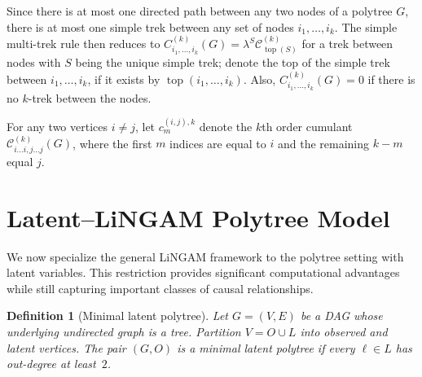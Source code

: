 \documentclass[11pt,a4paper]{article}
\numberwithin{equation}{section}
\newtheorem{definition}[theorem]{Definition}
\DeclareMathOperator{\ttop}{top}
\begin{document}
Since there is at most one directed path between any two nodes of a polytree $G$, there is at most one simple trek between any set of nodes $i_1,\dots,i_k$. The simple multi-trek rule then reduces to $C^{(k)}_{i_1,\dots,i_k}(G)=\lambda^{S}\mathcal{C}^{(k)}_{\ttop(S)}$ for a trek between nodes with $S$ being the unique simple trek; denote the top of the simple trek between $i_1,\dots,i_k$, if it exists by $\ttop(i_1,\dots,i_k)$. Also, $C^{(k)}_{i_1,\dots,i_k}(G)=0$ if there is no $k$-trek between the nodes.

For any two vertices $i\not=j$, let $c^{(i,j),k}_m$ denote the $k$th order cumulant $\mathcal{C}^{(k)}_{{i\dots i},{j\dots j}}(G)$, where the first $m$ indices are equal to $i$ and the remaining $k-m$ equal $j$.
\newcommand{\cumedge}[3]{c_{#1,#2#3}}  %
\section{Latent--LiNGAM Polytree Model}
\label{sec:model}

We now specialize the general LiNGAM framework to the polytree setting with latent variables. This restriction provides significant computational advantages while still capturing important classes of causal relationships.

\begin{definition}[Minimal latent polytree]\label{def:minimal_polytree}
Let $G=(V,E)$ be a DAG whose underlying undirected graph is a tree. Partition $V=O\cup L$ into observed and latent vertices. The pair $(G,O)$ is a \emph{minimal latent polytree} if every $\ell\in L$ has out-degree at least~$2$.
\end{definition}
\end{document}
